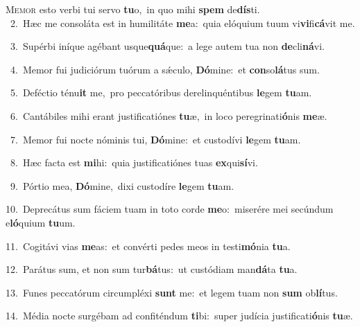 \lettrine{\initial\textcolor{\initialcolor}{M}}{emor} esto verbi tui servo \textbf{tu}\-o,~\star in quo mihi \textbf{spem} de\-\textbf{dís}\-ti.\\
{\numbfont\textcolor{\numbcolor}{~2.}}~Hæc me consoláta est in humilitáte \textbf{me}\-a:~\star quia elóquium tuum vi\-\textbf{vi}\-fi\-\textbf{cá}\-vit me.\par
{\numbfont\textcolor{\numbcolor}{~3.}}~Supérbi iníque agébant usque\-\textbf{quá}\-que:~\star a lege autem tua non \textbf{de}\-cli\-\textbf{ná}\-vi.\par
{\numbfont\textcolor{\numbcolor}{~4.}}~Memor fui judiciórum tuórum a sǽculo, \textbf{Dó}\-mine:~\star et \textbf{con}\-so\-\textbf{lá}\-tus sum.\par
{\numbfont\textcolor{\numbcolor}{~5.}}~Deféctio ténu\textbf{it} me,~\star pro peccatóribus derelinquéntibus \textbf{le}\-gem \textbf{tu}\-am.\par
{\numbfont\textcolor{\numbcolor}{~6.}}~Cantábiles mihi erant justificatiónes \textbf{tu}\-æ,~\star in loco peregrinati\-\textbf{ó}\-nis \textbf{me}\-æ.\par
{\numbfont\textcolor{\numbcolor}{~7.}}~Memor fui nocte nóminis tui, \textbf{Dó}\-mine:~\star et custodívi \textbf{le}\-gem \textbf{tu}\-am.\par
{\numbfont\textcolor{\numbcolor}{~8.}}~Hæc facta est \textbf{mi}\-hi:~\star quia justificatiónes tuas \textbf{ex}\-qui\-\textbf{sí}\-vi.\par
{\numbfont\textcolor{\numbcolor}{~9.}}~Pórtio mea, \textbf{Dó}\-mine,~\star dixi custodíre \textbf{le}\-gem \textbf{tu}\-am.\par
{\numbfont\textcolor{\numbcolor}{10.}}~Deprecátus sum fáciem tuam in toto corde \textbf{me}\-o:~\star miserére mei secúndum e\-\textbf{ló}\-quium \textbf{tu}\-um.\par
{\numbfont\textcolor{\numbcolor}{11.}}~Cogitávi vias \textbf{me}\-as:~\star et convérti pedes meos in testi\-\textbf{mó}\-nia \textbf{tu}\-a.\par
{\numbfont\textcolor{\numbcolor}{12.}}~Parátus sum, et non sum tur\-\textbf{bá}\-tus:~\star ut custódiam man\-\textbf{dá}\-ta \textbf{tu}\-a.\par
{\numbfont\textcolor{\numbcolor}{13.}}~Funes peccatórum circumpléxi \textbf{sunt} me:~\star et legem tuam non \textbf{sum} ob\-\textbf{lí}\-tus.\par
{\numbfont\textcolor{\numbcolor}{14.}}~Média nocte surgébam ad confiténdum \textbf{ti}\-bi:~\star super judícia justificati\-\textbf{ó}\-nis \textbf{tu}\-æ.\par
